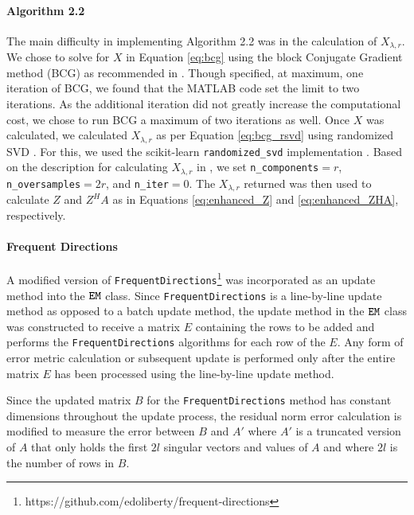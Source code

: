 \paragraph{Algorithm 2.2}

The main difficulty in implementing Algorithm 2.2 was in the calculation of $X_{\lambda,r}$.
We chose to solve for $X$ in Equation \ref{eq:bcg} using the block Conjugate Gradient method (BCG) \cite{OLeary1980} as recommended in \cite{Kalantzis2021}.
Though \cite{Kalantzis2021} specified, at maximum, one iteration of BCG, we found that the MATLAB code set the limit to two iterations.
As the additional iteration did not greatly increase the computational cost, we chose to run BCG a maximum of two iterations as well.
Once $X$ was calculated, we calculated $X_{\lambda,r}$ as per Equation \ref{eq:bcg_rsvd} using randomized SVD \cite{Halko2011}.
For this, we used the scikit-learn \verb|randomized_svd| implementation \cite{scikit-learn}.
Based on the description for calculating $X_{\lambda,r}$ in \cite{Kalantzis2021}, we set \verb|n_components|$=r$, \verb|n_oversamples|$=2r$, and \verb|n_iter|$=0$.
The $X_{\lambda,r}$ returned was then used to calculate $Z$ and $Z^H A$ as in Equations \ref{eq:enhanced_Z} and \ref{eq:enhanced_ZHA}, respectively.

\paragraph{Frequent Directions}

A modified version of \verb|FrequentDirections|\footnote{https://github.com/edoliberty/frequent-directions} was incorporated as an update method into the $\verb|EM|$ class.
Since \verb|FrequentDirections| is a line-by-line update method as opposed to a batch update method, the update method in the $\verb|EM|$ class was constructed to receive a matrix $E$ containing the rows to be added and performs the \verb|FrequentDirections| algorithms for each row of the $E$.
Any form of error metric calculation or subsequent update is performed only after the entire matrix $E$ has been processed using the line-by-line update method.

Since the updated matrix $B$ for the \verb|FrequentDirections| method has constant dimensions throughout the update process, the residual norm error calculation is modified to measure the error between $B$ and $A'$ where $A'$ is a truncated version of $A$ that only holds the first $2l$ singular vectors and values of $A$ and where $2l$ is the number of rows in $B$.

